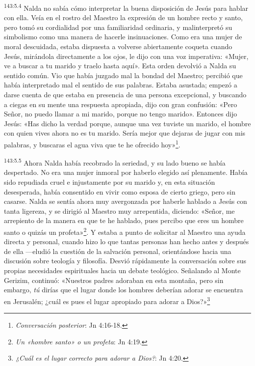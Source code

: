 \par 
\textsuperscript{143:5.4} Nalda no sabía cómo interpretar la buena disposición de Jesús para hablar con ella. Veía en el rostro del Maestro la expresión de un hombre recto y santo, pero tomó su cordialidad por una familiaridad ordinaria, y malinterpretó su simbolismo como una manera de hacerle insinuaciones. Como era una mujer de moral descuidada, estaba dispuesta a volverse abiertamente coqueta cuando Jesús, mirándola directamente a los ojos, le dijo con una voz imperativa: «Mujer, ve a buscar a tu marido y traelo hasta aquí». Esta orden devolvió a Nalda su sentido común. Vio que había juzgado mal la bondad del Maestro; percibió que había interpretado mal el sentido de sus palabras. Estaba asustada; empezó a darse cuenta de que estaba en presencia de una persona excepcional, y buscando a ciegas en su mente una respuesta apropiada, dijo con gran confusión: «Pero Señor, no puedo llamar a mi marido, porque no tengo marido». Entonces dijo Jesús: «Has dicho la verdad porque, aunque una vez tuviste un marido, el hombre con quien vives ahora no es tu marido. Sería mejor que dejaras de jugar con mis palabras, y buscaras el agua viva que te he ofrecido hoy»\footnote{\textit{Conversación posterior}: Jn 4:16-18.}.

\par 
\textsuperscript{143:5.5} Ahora Nalda había recobrado la seriedad, y su lado bueno se había despertado. No era una mujer inmoral por haberlo elegido así plenamente. Había sido repudiada cruel e injustamente por su marido y, en esta situación desesperada, había consentido en vivir como esposa de cierto griego, pero sin casarse. Nalda se sentía ahora muy avergonzada por haberle hablado a Jesús con tanta ligereza, y se dirigió al Maestro muy arrepentida, diciendo: «Señor, me arrepiento de la manera en que te he hablado, pues percibo que eres un hombre santo o quizás un profeta»\footnote{\textit{Un «hombre santo» o un profeta}: Jn 4:19.}. Y estaba a punto de solicitar al Maestro una ayuda directa y personal, cuando hizo lo que tantas personas han hecho antes y después de ella ---eludió la cuestión de la salvación personal, orientándose hacia una discusión sobre teología y filosofía. Desvió rápidamente la conversación sobre sus propias necesidades espirituales hacia un debate teológico. Señalando al Monte Gerizim, continuó: «Nuestros padres adoraban en esta montaña, pero sin embargo, \textit{tú} dirías que el lugar donde los hombres deberían adorar se encuentra en Jerusalén; ¿cuál es pues el lugar apropiado para adorar a Dios?»\footnote{\textit{¿Cuál es el lugar correcto para adorar a Dios?}: Jn 4:20.}

